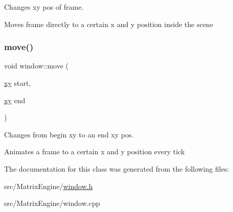 Changes xy pos of frame. 

Moves frame directly to a certain x and y position inside the scene \mbox{\label{classwindow_a6c22ca4ea83cd685762d6c7efb0f228a}} 
\subsubsection{\texorpdfstring{move()}{move()}\hspace{0.1cm}{\footnotesize\ttfamily [2/2]}}
{\footnotesize\ttfamily void window\+::move (\begin{DoxyParamCaption}\item[{\hyperlink{classxy}{xy}}]{start,  }\item[{\hyperlink{classxy}{xy}}]{end }\end{DoxyParamCaption})}



Changes from begin xy to an end xy pos. 

Animates a frame to a certain x and y position every tick 

The documentation for this class was generated from the following files\+:\begin{DoxyCompactItemize}
\item 
src/\+Matrix\+Engine/\hyperlink{window_8h}{window.\+h}\item 
src/\+Matrix\+Engine/window.\+cpp\end{DoxyCompactItemize}
